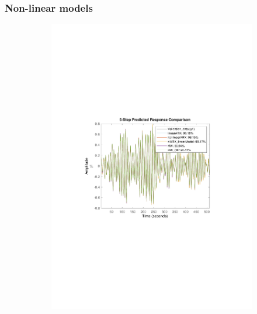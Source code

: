 \documentclass[]{article}
\begin{document}
\subsubsection{Non-linear models}
\begin{figure}[ht]
\centering
\begin{subfigure}{.49\textwidth}
	\centering
	\includegraphics[trim= 10cm 8cm 10cm 8cm, scale=0.4]{figures/predictions_nl.pdf}
\end{subfigure}
\begin{subfigure}{.49\textwidth}
	\centering

\end{subfigure}
\end{figure}
\end{document}
